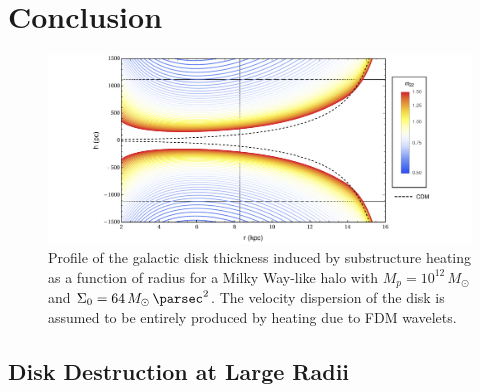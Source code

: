 \documentclass[usenatbib]{mnras}
\begin{document}
\section{Conclusion}

\begin{figure}
\includegraphics[width=18cm]{disk_shape}
\vspace*{-5mm}
\caption{Profile of the galactic disk thickness induced by substructure heating as a function of radius for a Milky Way-like halo with $M_p = 10^{12} \, M_\odot$ and $\Sigma_0 = 64 \, M_\odot \, \si{\per\parsec^2}$. The velocity dispersion of the disk is assumed to be entirely produced by heating due to FDM wavelets. }
\label{fig:disk_shape_FDM}
\end{figure}

\subsection{Disk Destruction at Large Radii}
\end{document}

